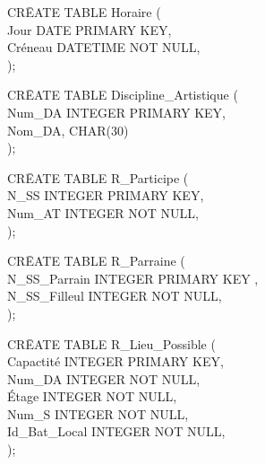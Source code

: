 \documentclass[a4paper,10.5pt]{report}
\begin{document}
		\begin{tabbing}
			CR\=EATE TABLE Horaire (\\
			\> Jour DATE PRIMARY KEY,\\
			\> Créneau DATETIME NOT NULL,\\);
		\end{tabbing}
		\begin{tabbing}
			CR\=EATE TABLE Discipline\_Artistique (\\
			\> Num\_DA INTEGER PRIMARY KEY,\\
			\> Nom\_DA, CHAR(30)\\);
		\end{tabbing}
		\begin{tabbing}
			CR\=EATE TABLE R\_Participe (\\
			\> N\_SS INTEGER PRIMARY KEY,\\
			\> Num\_AT INTEGER NOT NULL,\\);
		\end{tabbing}
		\begin{tabbing}
			CR\=EATE TABLE R\_Parraine (\\
			\> N\_SS\_Parrain INTEGER PRIMARY KEY ,\\
			\> N\_SS\_Filleul INTEGER NOT NULL,\\);
		\end{tabbing}
		\begin{tabbing}
			CR\=EATE TABLE R\_Lieu\_Possible (\\
			\> Capactité INTEGER PRIMARY KEY,\\
			\> Num\_DA INTEGER NOT NULL,\\
			\> Étage INTEGER NOT NULL,\\
			\> Num\_S INTEGER NOT NULL,\\
			\> Id\_Bat\_Local INTEGER NOT NULL,\\);
		\end{tabbing}
\end{document}
